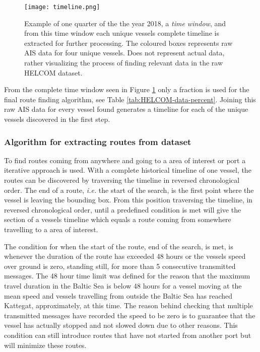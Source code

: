 \documentclass[../main.tex]{subfiles}
\begin{document}
\begin{figure}[H]
	\centering
	\texttt{[image: timeline.png]}
	\caption{Example of one quarter of the the year 2018, a \textit{time window}, and from this time window each unique vessels complete timeline is extracted for further processing. The coloured boxes represents raw AIS data for four unique vessels. Does not represent actual data, rather visualizing the process of finding relevant data in the raw HELCOM dataset.}
	\label{fig:timeline}
\end{figure}

From the complete time window seen in Figure \ref{fig:timeline} only a fraction is used for the final route finding algorithm, see Table \ref{tab:HELCOM-data-percent}. Joining this raw AIS data for every vessel found generates a timeline for each of the unique vessels discovered in the first step.

\subsubsection{Algorithm for extracting routes from dataset}
\label{sec:algo-section}
To find routes coming from anywhere and going to a area of interest or port a iterative approach is used. With a complete historical timeline of one vessel, the routes can be discovered by traversing the timeline in reversed chronological order. The end of a route, \textit{i.e.} the start of the search, is the first point where the vessel is leaving the bounding box. From this position traversing the timeline, in reversed chronological order, until a predefined condition is met will give the section of a vessels timeline which equals a route coming from somewhere travelling to a area of interest.

The condition for when the start of the route, end of the search, is met, is whenever the duration of the route has exceeded 48 hours or the vessels speed over ground is zero, standing still, for more than 5 consecutive transmitted messages. The 48 hour time limit was defined for the reason that the maximum travel duration in the Baltic Sea is below 48 hours for a vessel moving at the mean speed and vessels travelling from outside the Baltic Sea has reached Kattegat, approximately, at this time. The reason behind checking that multiple transmitted messages have recorded the speed to be zero is to guarantee that the vessel has actually stopped and not slowed down due to other reasons. This condition can still introduce routes that have not started from another port but will minimize these routes.
\end{document}
